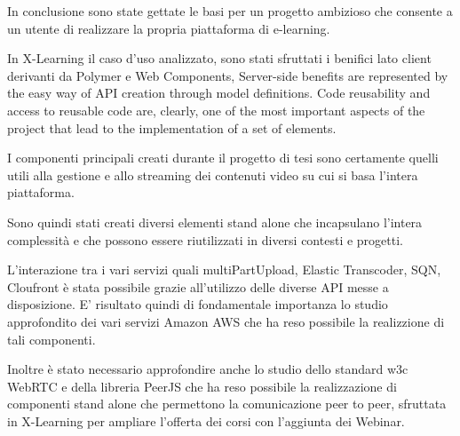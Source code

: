 
In conclusione sono state gettate le basi per un progetto ambizioso che consente a un utente di realizzare la propria piattaforma di e-learning.

In X-Learning il caso d'uso analizzato, sono stati sfruttati i benifici lato client derivanti da Polymer e Web Components, Server-side benefits are represented by the easy way of API creation through model definitions.
Code reusability and access to reusable code are, clearly, one of the most important aspects of the project that lead to the implementation of a set of elements.

I componenti principali creati durante il progetto di tesi sono certamente quelli utili alla gestione e allo streaming dei contenuti video su cui si basa l'intera piattaforma.

Sono quindi stati creati diversi elementi stand alone che incapsulano l'intera complessità e che possono essere riutilizzati in diversi contesti e progetti.

L'interazione tra i vari servizi quali multiPartUpload, Elastic Transcoder, SQN, Cloufront è stata possibile grazie all'utilizzo delle diverse API messe a disposizione.
E' risultato quindi di fondamentale importanza lo studio approfondito dei vari servizi Amazon AWS che ha reso possibile la realizzione di tali componenti.

Inoltre è stato necessario approfondire anche lo studio dello standard w3c WebRTC e della libreria PeerJS che ha reso possibile la realizzazione di componenti stand alone che permettono la comunicazione peer to peer, sfruttata in X-Learning per ampliare l'offerta dei corsi con l'aggiunta dei Webinar.